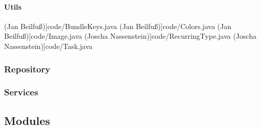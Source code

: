 		\paragraph{Utils}
 (Jan Beilfuß)]{code/BundleKeys.java}
 (Jan Beilfuß)]{code/Colors.java}
 (Jan Beilfuß)]{code/Image.java}
 (Joscha Nassenstein)]{code/RecurringType.java}
 (Joscha Nassenstein)]{code/Task.java}


	\subsubsection{Repository}














	\subsubsection{Services}





\subsection{Modules}
